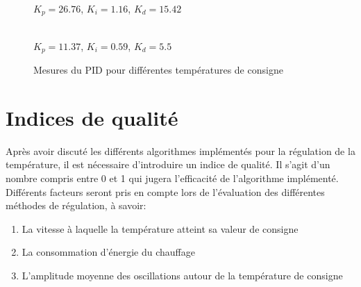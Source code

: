 \documentclass[12pt]{report}
\begin{document}
\begin{center}
\begin{figure}[H]
    \begin{minipage}[t]{8cm}
        \centering
        \\
        $K_p = 26.76$, $K_i = 1.16$, $K_d = 15.42$
    \end{minipage}\hfill
    \begin{minipage}[t]{8cm}
        \centering
        \\
        $K_p = 11.37$, $K_i = 0.59$, $K_d = 5.5$
    \end{minipage}
    \caption{\label{pid} Mesures du PID pour différentes températures de consigne}
\end{figure}
\end{center}

\section{Indices de qualité}

Après avoir discuté les différents algorithmes implémentés pour la régulation de la température, il est nécessaire d'introduire un indice de qualité. Il s'agit d'un nombre compris entre 0 et 1 qui jugera l'efficacité de l'algorithme implémenté. Différents facteurs seront pris en compte lors de l'évaluation des différentes méthodes de régulation, à savoir:
\begin{enumerate}
\item La vitesse à laquelle la température atteint sa valeur de consigne
\item La consommation d'énergie du chauffage
\item L'amplitude moyenne des oscillations autour de la température de consigne
\end{enumerate}
\end{document}
